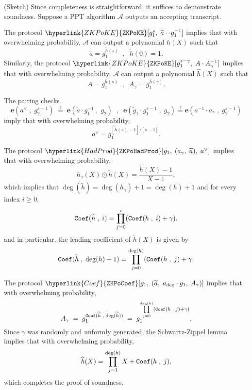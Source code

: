 \documentclass[11pt, lettersize, notitlepage, leqno, footskip=0.6cm]{article}
\newcommand{\bFp}{\mathbb{F}_p}
\newcommand{\wti}{\widetilde}
\newcommand{\mc}{\mathcal}
\newcommand{\mbf}{\mathbf}
\newcommand{\what}{\widehat}
\newcommand{\vs}{\vspace{-0.15cm}}
\newcommand{\noin}{\noindent}
\newcommand{\op}{overwhelming probability}
\newcommand{\sta}{\stackrel{?}{=}}
\newcommand{\e}{\mbf{e}}
\numberwithin{equation}{section}
\begin{document}
\begin{prf} (Sketch) Since completeness is straightforward, it suffices to demonstrate soundness. Suppose a PPT algorithm $\mc{A}$ outputs an accepting transcript.


The protocol $\hyperlink{ZKPoKE}{\tt{ZKPoKE}}[g_1^{s},\;\wti{a}\cdot \cdot g_1^{-1}] $ implies that with \op, $\mc{A}$ can output a polynomial $\wti{h}(X)$ such that \vs $$ \wti{a} = g_1^{{\wti{h}}(s)}\;\;,\;\; \wti{h}(0) = 1 . $$ Similarly, the protocol  $\hyperlink{ZKPoKE}{\tt{ZKPoKE}}[g_1^{s-\gamma},\; A\cdot A_{\gamma}^{-1}]$ implies that with \op, $\mc{A}$ can output a polynomial $\what{h}(X)$ such that \vs $$ A = g_1^{\what{h}(s)}\;\;,\;\;A_{\gamma} = g_1^{\what{h}(\gamma)} .   $$


\noin The pairing checks \vs $$ \e(a^{\vee}\;,\;g_2^{s-1})\;\sta\; \e(\wti{a}\cdot g_1^{-1}\;,\;g_2)\;\;,\;\;\e(\wti{g}_1\cdot g_1^{s-1}\;,\;g_2)\sta \e(a^{-1}\cdot a_{\gamma}\;,\;g_2^{s-1}) $$ imply that with \op, \vs $$ a^{\vee} = g_1^{[\wti{h}(s)-1]\big/[s-1]} .  $$ 

\noin The protocol $\hyperlink{HadProd}{\tt{ZKPoHadProd}}[g_1,\;({a}_{\gamma},\;\wti{a}),\;a^{\vee}] $ implies that with \op, \vs $$ h_{\gamma}(X)\odot \wti{h}(X) =  \frac{\wti{h}(X)-1}{X-1}, $$ which implies that $\deg(\wti{h}) = \deg(h_{\gamma})+1 = \deg(h)+1$ and for every index $i\geq 0$, \vs $$ {\tt{Coef}}(\wti{h}\;,\;i) = \prod\limits_{j=0}^{i} ({\tt{Coef}}({h}\;,\;i) + \gamma) . $$ and in particular, the leading coefficient of $\wti{h}(X)$ is given by \vs $$ {\tt{Coef}}(\wti{h}\;,\;\deg(h)+1) = \prod\limits_{j=0}^{\deg(h)} ({\tt{Coef}}({h}\;,\;j) + \gamma  . $$     

\noin The protocol $\hyperlink{Coef}{\tt{ZKPoCoef}}[g_1,\;(\wti{a},\; a_{\deg}\cdot g_1,\; A_{\gamma})] $ implies that with \op, \vs $$ A_{\gamma} \;=\; g_1^{{\tt{Coef}}(\wti{h}\;,\;\deg(\wti{h}))} \;=\; g_1^{\prod\limits_{j=0}^{\deg(h)} ({\tt{Coef}}({h}\;,\;j) + \gamma)} .$$ Since $\gamma$ was randomly and unformly generated, the Schwartz-Zippel lemma implies that with \op, \vs $$ \what{h}(X) = \prod\limits_{j=1}^{\deg(h)} X + {\tt{Coef}}({h}\;,\;j) ,$$ which completes the proof of soundness. \end{prf}
\end{document}
